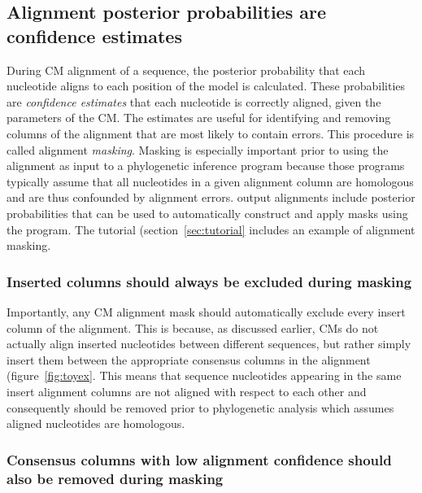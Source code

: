 \subsection{Alignment posterior probabilities are confidence estimates}
\label{sec:background-pp}

During CM alignment of a sequence, the posterior probability that 
each nucleotide aligns to each position of the model is calculated. 
These probabilities are \emph{confidence estimates} that each
nucleotide is correctly aligned, given the parameters of the CM. The
estimates are useful for identifying and removing columns of the
alignment that are most likely to contain errors. This procedure is called
alignment \emph{masking}. Masking is especially important prior to
using the alignment as input to a phylogenetic inference program
because those programs typically assume that all nucleotides in a
given alignment column are homologous and are thus confounded by 
alignment errors.  output alignments include posterior
probabilities that can be used to automatically construct and apply
masks using the  program. The tutorial
(section~\ref{sec:tutorial} includes an example of alignment masking. 


\subsubsection{Inserted columns should always be excluded during masking}

Importantly, any CM alignment mask should automatically exclude 
every insert column of the alignment. This is because, as discussed
earlier, CMs do not actually align inserted nucleotides between
different sequences, but rather simply insert them between the
appropriate consensus columns in the alignment
(figure~\ref{fig:toyex}. This means that sequence nucleotides
appearing in the same insert alignment columns are not aligned with
respect to each other and consequently should be removed prior to
phylogenetic analysis which assumes aligned nucleotides are
homologous. 

\subsubsection{Consensus columns with low alignment confidence should
  also be removed during masking}

